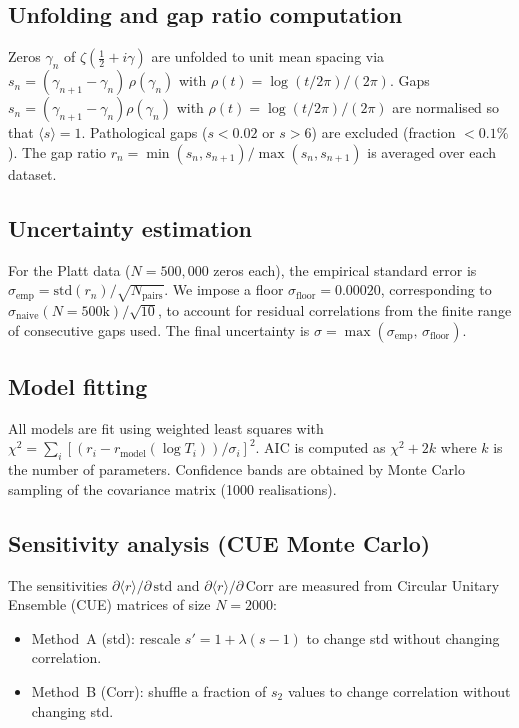 
\subsection*{Unfolding and gap ratio computation}

Zeros $\gamma_n$ of $\zeta(\tfrac{1}{2} + i\gamma)$ are unfolded to unit mean
spacing via $s_n = (\gamma_{n+1} - \gamma_n)\,\rho(\gamma_n)$ with
$\rho(t) = \log(t/2\pi)/(2\pi)$.
Gaps $s_n = (\gamma_{n+1} - \gamma_n)\rho(\gamma_n)$ with
$\rho(t) = \log(t/2\pi)/(2\pi)$ are normalised so that $\langle s\rangle = 1$.
Pathological gaps ($s < 0.02$ or $s > 6$) are excluded (fraction $< 0.1\%$).
The gap ratio $r_n = \min(s_n, s_{n+1})/\max(s_n, s_{n+1})$ is averaged over
each dataset.

\subsection*{Uncertainty estimation}

For the Platt data ($N = 500{,}000$ zeros each), the empirical standard error
is $\sigma_{\mathrm{emp}} = \mathrm{std}(r_n)/\sqrt{N_{\mathrm{pairs}}}$.
We impose a floor $\sigma_{\mathrm{floor}} = 0.00020$, corresponding to
$\sigma_{\mathrm{naive}}(N{=}500\mathrm{k})/\sqrt{10}$, to account for
residual correlations from the finite range of consecutive gaps used.
The final uncertainty is $\sigma = \max(\sigma_{\mathrm{emp}},\, \sigma_{\mathrm{floor}})$.

\subsection*{Model fitting}

All models are fit using weighted least squares with
$\chi^2 = \sum_i [(r_i - r_{\mathrm{model}}(\log T_i))/\sigma_i]^2$.
AIC is computed as $\chi^2 + 2k$ where $k$ is the number of parameters.
Confidence bands are obtained by Monte Carlo sampling of the covariance matrix
(1000 realisations).

\subsection*{Sensitivity analysis (CUE Monte Carlo)}

The sensitivities $\partial\langle r\rangle/\partial\,\mathrm{std}$ and
$\partial\langle r\rangle/\partial\,\mathrm{Corr}$ are measured from
Circular Unitary Ensemble (CUE) matrices of size $N = 2000$:
\begin{itemize}
\item Method~A (std): rescale $s' = 1 + \lambda(s-1)$ to change std without
changing correlation.
\item Method~B (Corr): shuffle a fraction of $s_2$ values to change correlation
without changing std.
\end{itemize}

